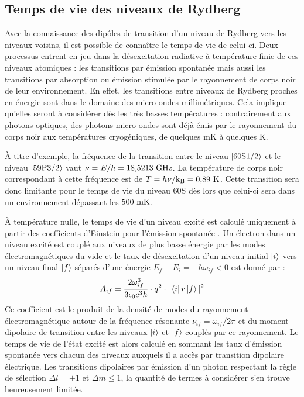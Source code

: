 	\subsection{Temps de vie des niveaux de Rydberg}
\noindent Avec la connaissance des dipôles de transition d'un niveau de Rydberg vers les niveaux voisins, 	il est possible de connaître le temps de vie de celui-ci.
Deux processus entrent en jeu dans la désexcitation radiative à température finie de ces niveaux atomiques :
les transitions par émission spontanée mais aussi les transitions par absorption ou émission stimulée par le rayonnement de corps noir de leur environnement.
En effet, les transitions entre niveaux de Rydberg proches en énergie sont dans le domaine des micro-ondes millimétriques.
Cela implique qu'elles seront à considérer dès les très basses températures : contrairement aux photons optiques, des photons micro-ondes sont déjà émis par le rayonnement du corps noir aux températures cryogéniques, de quelques \si{\milli\kelvin} à quelques \si{\kelvin}.

\`A titre d'exemple, la fréquence de la transition entre le niveau $\ket{60\mathrm{S}1/2}$ et le niveau $\ket{59\mathrm{P}3/2}$ vaut $\nu = E/h = \numv{18.5213}\si{\giga\hertz}$. La température de corps noir correspondant à cette fréquence est de $T=h\nu /\kb = \numv{0.89}\si{\kelvin}$.
Cette transition sera donc limitante pour le temps de vie du niveau 60S dès lors que celui-ci sera dans un environnement dépassant les $\numv{500}\si{\milli\kelvin}$.

\`A température nulle, le temps de vie d'un niveau excité est calculé uniquement à partir des coefficients d'Einstein pour l'émission spontanée \cite{MX_GALLAGHERBBODY}. Un électron dans un niveau excité est couplé aux niveaux de plus basse énergie par les modes électromagnétiques du vide et le taux de désexcitation d'un niveau initial $\ket{i}$ vers un niveau final $\ket{f}$ séparés d'une énergie $E_f - E_i = -\hbar \omega_{if} < 0$ est donné par :
\begin{equation}\label{eq:EinsteinAif}
A_{if} = \frac{2\omega_{if}^3}{3\epsilon_0c^3h}\cdot q^2\cdot |\bra{i}r\ket{f}|^2
\end{equation}
Ce coefficient est le produit de la densité de modes du rayonnement électromagnétique autour de la fréquence résonante $\nu_{if}=\omega_{if}/2\pi$ et du moment dipolaire de transition entre les niveaux $\ket{i}$ et $\ket{f}$ couplés par ce rayonnement.
Le temps de vie de l'état excité est alors calculé en sommant les taux d'émission spontanée vers chacun des niveaux auxquels il a accès par transition dipolaire électrique.
Les transitions dipolaires par émission d'un photon respectant la règle de sélection $\Delta l = \pm1$ et $\Delta m \leq 1$, la quantité de termes à considérer s'en trouve heureusement limitée.

